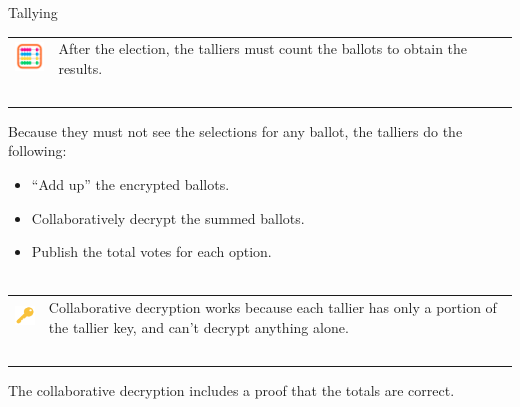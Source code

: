 \documentclass[aspectratio=169]{beamer}
\begin{document}
\begin{frame}{Tallying}
    \begin{tabular}{>{\arraybackslash}m{40px} >{\arraybackslash}m{320px}}
        \includegraphics[width=30px]{images/abacus.png} & After the election, the talliers must count the ballots to obtain the results. \\~\\
    \end{tabular}

    Because they must not see the selections for any ballot, the talliers do the following:
    \begin{itemize}
        \item ``Add up'' the encrypted ballots.
        \item Collaboratively decrypt the summed ballots.
        \item Publish the total votes for each option. \\~\\
    \end{itemize}

    \begin{tabular}{>{\arraybackslash}m{40px} >{\arraybackslash}m{320px}}
        \includegraphics[width=30px]{images/key.png} & Collaborative decryption works because each tallier has only a portion of the tallier key, and can't decrypt anything alone. \\~\\
    \end{tabular}

    The collaborative decryption includes a proof that the totals are correct.
\end{frame}
\end{document}
